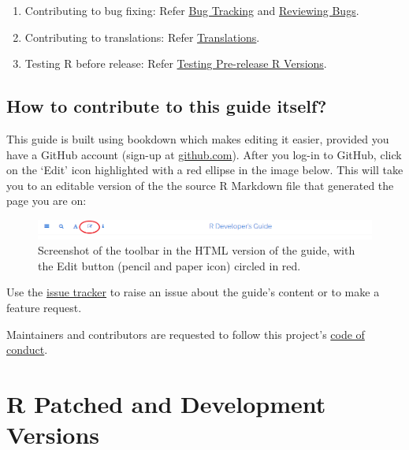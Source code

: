 \documentclass[
]{book}
\providecommand{\tightlist}{%
  \setlength{\itemsep}{0pt}\setlength{\parskip}{0pt}}
\begin{document}
\begin{enumerate}
\def\labelenumi{\arabic{enumi}.}
\tightlist
\item
  Contributing to bug fixing: Refer \protect\hyperlink{BugTrack}{Bug Tracking} and \protect\hyperlink{ReviewBugs}{Reviewing Bugs}.
\item
  Contributing to translations: Refer \protect\hyperlink{}{Translations}.
\item
  Testing R before release: Refer \protect\hyperlink{TestRVer}{Testing Pre-release R Versions}.
\end{enumerate}

\hypertarget{how-to-contribute-to-this-guide}{%
\section*{How to contribute to this guide itself?}\label{how-to-contribute-to-this-guide}}

This guide is built using bookdown which makes editing it easier, provided you have a GitHub account (sign-up at \href{https://github.com/}{github.com}). After you log-in to GitHub, click on the `Edit' icon highlighted with a red ellipse in the image below. This will take you to an editable version of the the source R Markdown file that generated the page you are on:

\begin{figure}
\centering
\includegraphics{img/edit_icon.png}
\caption{Screenshot of the toolbar in the HTML version of the guide, with the Edit button (pencil and paper icon) circled in red.}
\end{figure}

Use the \href{https://github.com/r-devel/rdevguide/issues}{issue tracker} to raise an issue about the guide's content or to make a feature request.

Maintainers and contributors are requested to follow this project's \href{https://github.com/r-devel/rdevguide/blob/main/CONDUCT.md}{code of conduct}.

\hypertarget{GetStart}{%
\chapter{R Patched and Development Versions}\label{GetStart}}
\end{document}
